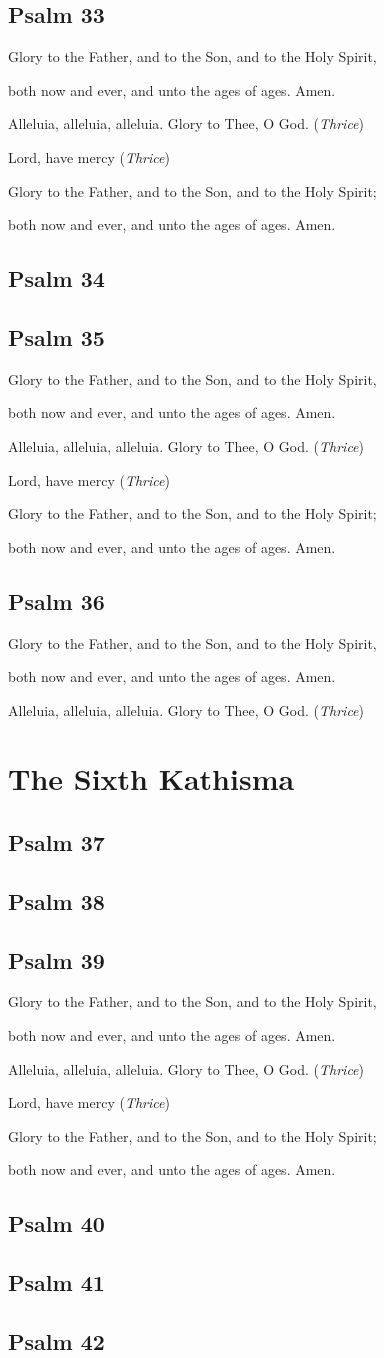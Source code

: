 \documentclass[12pt,openany]{book}
\newcommand{\kathismabreak}{
  \medskip
  \begin{center}
  \begin{footnotesize}
  Glory to the Father, and to the Son, and to the Holy Spirit,
  
  both now and ever, and unto the ages of ages. Amen.

  Alleluia, alleluia, alleluia. Glory to Thee, O God. (\textit{Thrice})

  Lord, have mercy (\textit{Thrice})

  Glory to the Father, and to the Son, and to the Holy Spirit;
  
  both now and ever, and unto the ages of ages. Amen.
  \end{footnotesize}
  \end{center}
  \smallbreak
}
\newcommand{\kathismaend}{
  \medskip
  \begin{center}
  \begin{footnotesize}
  Glory to the Father, and to the Son, and to the Holy Spirit,
  
  both now and ever, and unto the ages of ages. Amen.

  Alleluia, alleluia, alleluia. Glory to Thee, O God. (\textit{Thrice})
  \end{footnotesize}
  \end{center}
  \smallbreak
}
\begin{document}
\section{Psalm 33}


\kathismabreak
\smallskip

\section{Psalm 34}

\smallskip
\section{Psalm 35}


\pagebreak %
\kathismabreak
\smallskip

\section{Psalm 36}


\kathismaend

\chapter*{The Sixth Kathisma}
\smallskip
\section{Psalm 37}

\smallskip
\section{Psalm 38}

\smallskip
\section{Psalm 39}


\kathismabreak
\section{Psalm 40}

\smallskip
\section{Psalm 41}

\smallskip
\section{Psalm 42}

\end{document}
